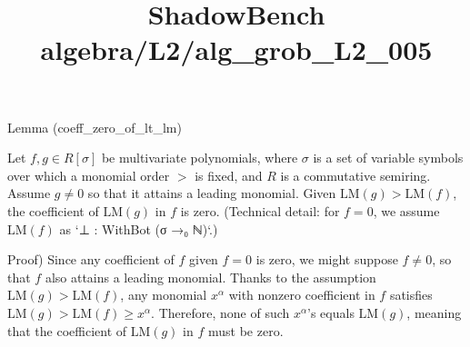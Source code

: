 \documentclass{article}
\title{ShadowBench algebra/L2/alg\_grob\_L2\_005}
\begin{document}
\maketitle

Lemma (coeff_zero_of_lt_lm)

Let $f, g\in R[\sigma]$ be multivariate polynomials, where $\sigma$ is a set of variable symbols over which a monomial order $>$ is fixed, and $R$ is a commutative semiring. Assume $g \ne 0$ so that it attains a leading monomial. Given $\mathrm{LM}(g) > \mathrm{LM}(f)$, the coefficient of $\mathrm{LM}(g)$ in $f$ is zero.
(Technical detail: for $f = 0$, we assume $\mathrm{LM}(f)$ as `⊥ : WithBot (σ →₀ ℕ)`.)

Proof)
Since any coefficient of $f$ given $f = 0$ is zero, we might suppose $f \ne 0$, so that $f$ also attains a leading monomial. Thanks to the assumption $\mathrm{LM}(g) > \mathrm{LM}(f)$, any monomial $x^\alpha$ with nonzero coefficient in $f$ satisfies $\mathrm{LM}(g) > \mathrm{LM}(f) \ge x^\alpha$. Therefore, none of such $x^\alpha$'s equals $\mathrm{LM}(g)$, meaning that the coefficient of $\mathrm{LM}(g)$ in $f$ must be zero.
\end{document}
